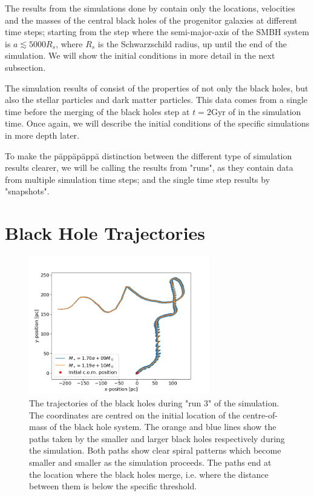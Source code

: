 \documentclass[english, oneside]{HYgradu}
\begin{document}
The results from the simulations done by \cite{Mannerkoski2019} contain only the locations, velocities and the masses of the central black holes of the progenitor galaxies at different time steps; starting from the step where the semi-major-axis of the SMBH system is $a \lesssim 5000 R_s$, where $R_s$ is the Schwarzschild radius, up until the end of the simulation. We will show the initial conditions in more detail in the next subsection.

The simulation results of \cite{Rantala2018} consist of the properties of not only the black holes, but also the stellar particles and dark matter particles. This data comes from a single time before the merging of the black holes step at $t = 2 \mathrm{Gyr}$ of in the simulation time. Once again, we will describe the initial conditions of the specific simulations in more depth later.

To make the päppäpäppä distinction between the different type of simulation results clearer, we will be calling the results from \cite{Mannerkoski2019} "runs", as they contain data from multiple simulation time steps; and the single time step results by \cite{Rantala2018} "snapshots".


\section{Black Hole Trajectories}

\begin{figure}[h]
	\centering	
	\includegraphics[width=0.7\textwidth]{Run3_Trajectory.png}	
	\caption{The trajectories of the black holes during "run 3" of the simulation. The coordinates are centred on the initial location of the centre-of-mass of the black hole system. The orange and blue lines show the paths taken by the smaller and larger black holes respectively during the simulation. Both paths show clear spiral patterns which become smaller and smaller as the simulation proceeds. The paths end at the location where the black holes merge, i.e. where the distance between them is below the specific threshold.}
\end{figure}
\end{document}
